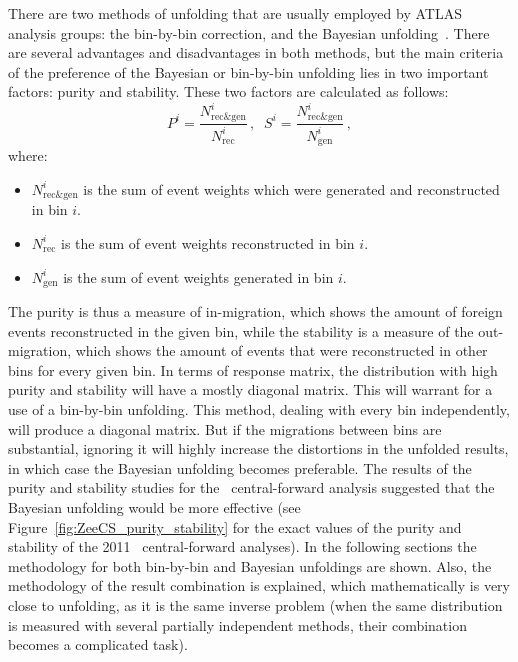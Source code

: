 There are two methods of unfolding that are usually employed by ATLAS analysis groups: the bin-by-bin correction, and the Bayesian unfolding~\cite{lib:zcs_unfolding}. There are several advantages and disadvantages in both methods, but the main criteria of the preference of the Bayesian or bin-by-bin unfolding lies in two important factors: purity and stability. These two factors are calculated as follows:
\begin{equation}
P^{i} = \frac{N^{i}_{\text{rec\&gen}} }{ N^{i}_{\text{rec}} }\,, \; \;
S^{i} = \frac{N^{i}_{\text{rec\&gen}} }{ N^{i}_{\text{gen}} }\,,
\end{equation}
where:
\begin{itemize}
\item {\bfseries $N^i_{\text{rec\&gen}}$} is the sum of event weights which were generated and reconstructed in bin $i$.
\item {\bfseries $N^i_{\text{rec}}$} is the sum of event weights reconstructed in bin $i$.
\item {\bfseries $N^i_{\text{gen}}$} is the sum of event weights generated in bin $i$.
\end{itemize}

The purity is thus a measure of in-migration, which shows the amount of foreign events reconstructed in the given bin, while the stability is a measure of the out-migration, which shows the amount of events that were reconstructed in other bins for every given bin. In terms of response matrix, the distribution with high purity and stability will have a mostly diagonal matrix. This will warrant for a use of a bin-by-bin unfolding. This method, dealing with every bin independently, will produce a diagonal matrix. But if the migrations between bins are substantial, ignoring it will highly increase the distortions in the unfolded results, in which case the Bayesian unfolding becomes preferable. The results of the purity and stability studies for the \Zee\ central-forward analysis suggested that the Bayesian unfolding would be more effective (see Figure~\ref{fig:ZeeCS_purity_stability} for the exact values of the purity and stability of the 2011 \Zee\ central-forward analyses). In the following sections the methodology for both bin-by-bin and Bayesian unfoldings are shown. Also, the methodology of the result combination is explained, which mathematically is very close to unfolding, as it is the same inverse problem (when the same distribution is measured with several partially independent methods, their combination becomes a complicated task).

